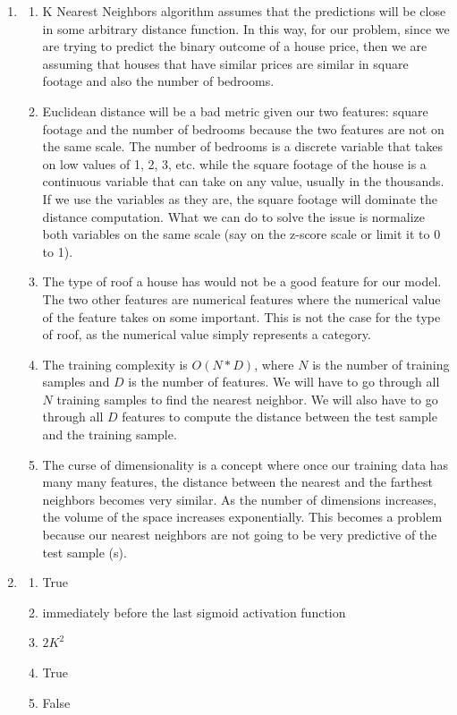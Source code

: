 \documentclass[12pt]{article}
\begin{document}
\begin{enumerate}
\begin{enumerate}
  \end{enumerate}
 \item
 \begin{enumerate}
     \item K Nearest Neighbors algorithm assumes that the predictions will be close in some arbitrary distance function. In this way, for our problem, since we are trying to predict the binary outcome of a house price, then we are assuming that houses that have similar prices are similar in square footage and also the number of bedrooms.
     \item Euclidean distance will be a bad metric given our two features: square footage and the number of bedrooms because the two features are not on the same scale. The number of bedrooms is a discrete variable that takes on low values of 1, 2, 3, etc. while the square footage of the house is a continuous variable that can take on any value, usually in the thousands. If we use the variables as they are, the square footage will dominate the distance computation. What we can do to solve the issue is normalize both variables on the same scale (say on the z-score scale or limit it to 0 to 1).
     \item The type of roof a house has would not be a good feature for our model. The two other features are numerical features where the numerical value of the feature takes on some important. This is not the case for the type of roof, as the numerical value simply represents a category. 
     \item The training complexity is $O(N * D)$, where $N$ is the number of training samples and $D$ is the number of features. We will have to go through all $N$ training samples to find the nearest neighbor. We will also have to go through all $D$ features to compute the distance between the test sample and the training sample.
     \item The curse of dimensionality is a concept where once our training data has many many features, the distance between the nearest and the farthest neighbors becomes very similar. As the number of dimensions increases, the volume of the space increases exponentially. This becomes a problem because our nearest neighbors are not going to be very predictive of the test sample (s).
 \end{enumerate}

 \item 
 \begin{enumerate}
      \item True 
      \item immediately before the last sigmoid activation function
      \item $2K^2$
      \item True
      \item False
 \end{enumerate}

\end{enumerate}
\end{document}

